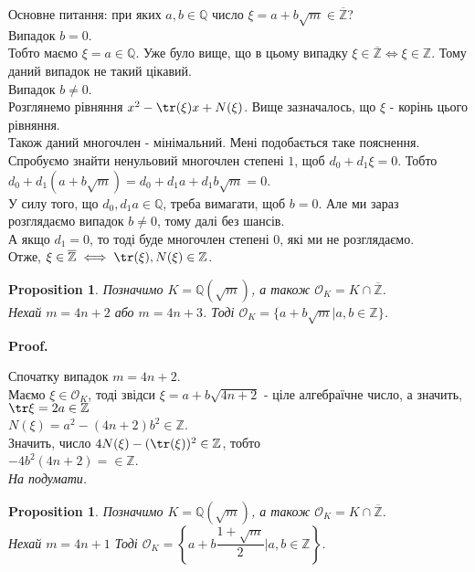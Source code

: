 \documentclass[a4paper, 14pt]{extarticle}
\makeatletter
\theoremstyle{theoremdd}
\theoremstyle{theoremdd}
\theoremstyle{theoremdd}
\theoremstyle{theoremdd}
\theoremstyle{theoremdd}
\newtheorem{proposition}[theorem]{Proposition}
\theoremstyle{theoremdd}
\theoremstyle{theoremdd}
\theoremstyle{theoremdd}
\def\qed{$\blacksquare$}
\renewenvironment{proof}[1][Proof.\\]{\par
\pushQED{\hfill \qed}%
\normalfont \topsep6\p@\@plus6\p@\relax
\trivlist
\item\relax
{\bfseries
#1\@addpunct{.}}\hspace\labelsep\ignorespaces
}{%
\popQED\endtrivlist\@endpefalse
}
\makeatother
\begin{document}
Основне питання: при яких $a,b \in \mathbb{Q}$ число $\xi = a + b\sqrt{m} \in \overline{\mathbb{Z}}$?\\
Випадок $b = 0$.\\
Тобто маємо $\xi = a \in \mathbb{Q}$. Уже було вище, що в цьому випадку $\xi \in \overline{\mathbb{Z}} \iff \xi \in \mathbb{Z}$. Тому даний випадок не такий цікавий.
\bigskip \\
Випадок $b \neq 0$.\\
Розглянемо рівняння $x^2 - \tr(\xi)x + N(\xi)$. Вище зазначалось, що $\xi$ - корінь цього рівняння.\\
Також даний многочлен - мінімальний. Мені подобається таке пояснення.\\
Спробуємо знайти ненульовий многочлен степені $1$, щоб $d_0+d_1 \xi = 0$. Тобто\\
$d_0 + d_1 (a+b\sqrt{m}) = d_0 +d_1 a + d_1 b \sqrt{m} = 0$.\\
У силу того, що $d_0,d_1a \in \mathbb{Q}$, треба вимагати, щоб $b = 0$. Але ми зараз розглядаємо випадок $b \neq 0$, тому далі без шансів.\\
А якщо $d_1 = 0$, то тоді буде многочлен степені $0$, які ми не розглядаємо.\\
Отже, $\xi \in \overline{\mathbb{Z}} \iff \tr(\xi), N(\xi) \in \mathbb{Z}$.

\begin{proposition}
Позначимо $K = \mathbb{Q}(\sqrt{m})$, а також $\mathcal{O}_K = K \cap \overline{\mathbb{Z}}$.\\
Нехай $m = 4n+2$ або $m = 4n+3$. Тоді $\mathcal{O}_K = \{a + b \sqrt{m} | a,b \in \mathbb{Z} \}$.
\end{proposition}

\begin{proof}
Спочатку випадок $m = 4n+2$. \\
Маємо $\xi \in \mathcal{O}_K$, тоді звідси $\xi = a+b \sqrt{4n+2}$ - ціле алгебраїчне число, а значить, \\
$\tr \xi = 2a \in \mathbb{Z}$\\
$N(\xi) = a^2-(4n+2)b^2 \in \mathbb{Z}$.\\
Значить, число $4N(\xi) - (\tr(\xi))^2 \in \mathbb{Z}$, тобто\\
$-4b^2(4n+2) = \in \mathbb{Z}$.\\
\textit{На подумати.}
\end{proof}

\begin{proposition}
Позначимо $K = \mathbb{Q}(\sqrt{m})$, а також $\mathcal{O}_K = K \cap \overline{\mathbb{Z}}$.\\
Нехай $m = 4n+1$ Тоді $\mathcal{O}_K = \left\{a + b \dfrac{1+\sqrt{m}}{2} | a,b \in \mathbb{Z} \right\}$.
\end{proposition}
\end{document}
